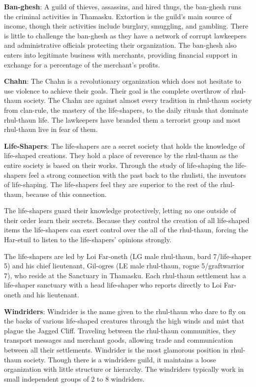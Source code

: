 {
	\textbf{Ban-ghesh}: A guild of thieves, assassins, and hired thugs, the ban-ghesh runs the criminal activities in Thamasku. Extortion is the guild's main source of income, though their activities include burglary, smuggling, and gambling. There is little to challenge the ban-ghesh as they have a network of corrupt lawkeepers and administrative officials protecting their organization. The ban-ghesh also enters into legitimate business with merchants, providing financial support in exchange for a percentage of the merchant's profits.

	\textbf{Chahn}: The Chahn is a revolutionary organization which does not hesitate to use violence to achieve their goals. Their goal is the complete overthrow of rhul-thaun society. The Chahn are against almost every tradition in rhul-thaun society from clan-rule, the mastery of the life-shapers, to the daily rituals that dominate rhul-thaun life. The lawkeepers have branded them a terrorist group and most rhul-thaun live in fear of them.

	\textbf{Life-Shapers}: The life-shapers are a secret society that holds the knowledge of life-shaped creations. They hold a place of reverence by the rhul-thaun as the entire society is based on their works. Through the study of life-shaping the life-shapers feel a strong connection with the past back to the rhulisti, the inventors of life-shaping. The life-shapers feel they are superior to the rest of the rhul-thaun, because of this connection.

	The life-shapers guard their knowledge protectively, letting no one outside of their order learn their secrets. Because they control the creation of all life-shaped items the life-shapers can exert control over the all of the rhul-thaun, forcing the Har-etuil to listen to the life-shapers' opinions strongly.

	The life-shapers are led by Loi Far-oneth (LG male rhul-thaun, bard 7/life-shaper 5) and his chief lieutenant, Gil-ogres (LE male rhul-thaun, rogue 5/graftwarrior 7), who reside at the Sanctuary in Thamasku. Each rhul-thaun settlement has a life-shaper sanctuary with a head life-shaper who reports directly to Loi Far-oneth and his lieutenant.

	\textbf{Windriders}: Windrider is the name given to the rhul-thaun who dare to fly on the backs of various life-shaped creatures through the high winds and mist that plague the Jagged Cliff. Traveling between the rhul-thaun communities, they transport messages and merchant goods, allowing trade and communication between all their settlements. Windrider is the most glamorous position in rhul-thaun society. Though there is a windriders guild, it maintains a loose organization with little structure or hierarchy. The windriders typically work in small independent groups of 2 to 8 windriders.
}
